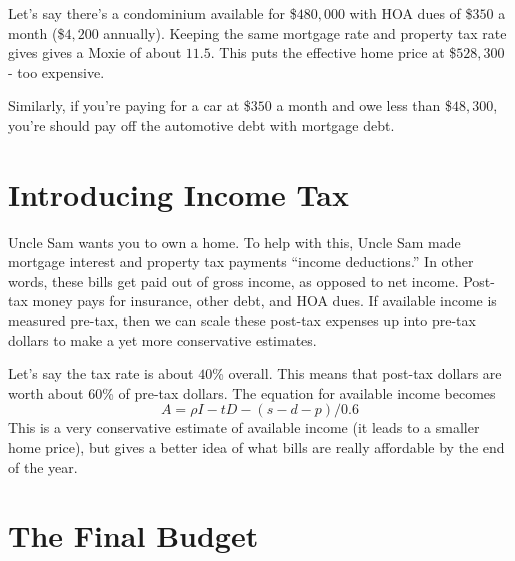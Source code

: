 \documentclass{article}
\begin{document}
Let's say there's a condominium available for \$$480,000$ with HOA dues of \$$350$ a month (\$$4,200$ annually).  Keeping the same mortgage rate and property tax rate gives gives a Moxie of about $11.5$.  This puts the effective home price at \$$528,300$ - too expensive.

Similarly, if you're paying for a car at \$$350$ a month and owe less than \$$48,300$, you're should pay off the automotive debt with mortgage debt.

\section{Introducing Income Tax}

Uncle Sam wants you to own a home. To help with this, Uncle Sam made mortgage interest and property tax payments ``income deductions.'' In other words, these bills get paid out of gross income, as opposed to net income. Post-tax money pays for insurance, other debt, and HOA dues. If available income is measured pre-tax, then we can scale these post-tax expenses up into pre-tax dollars to make a yet more conservative estimates.

Let's say the tax rate is about $40$\% overall. This means that post-tax dollars are worth about $60$\% of pre-tax dollars. The equation for available income becomes
\begin{equation}
\label{AvailableIncomePostTax}
A = \rho I - tD - (s - d - p) / 0.6
\end{equation}
This is a very conservative estimate of available income (it leads to a smaller home price), but gives a better idea of what bills are really affordable by the end of the year.

\section{The Final Budget}
\end{document}
